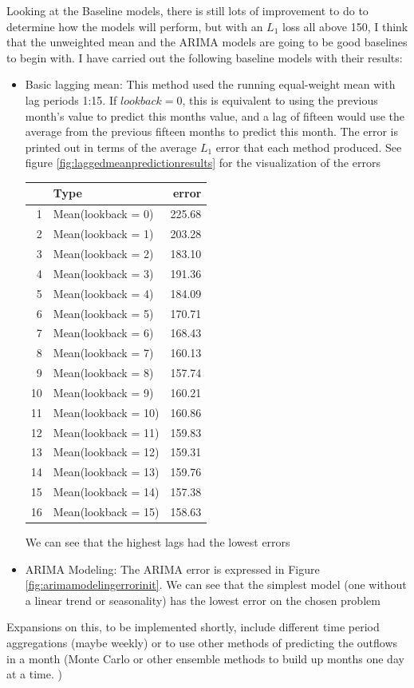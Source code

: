 \documentclass[11pt,a4paper]{article}
\newenvironment{updatematerial}{
\color{blue}
}{

}
\begin{document}
\begin{updatematerial}
	Looking at the Baseline models, there is still lots of improvement to do to determine how the models will perform, but with an $L_1$ loss all above 150, I think that the unweighted mean and the ARIMA models are going to be good baselines to begin with. I have carried out the following baseline models with their results:
	\begin{itemize}
		\item Basic lagging mean: This method used the running equal-weight mean with lag periods 1:15. If $lookback = 0$, this is equivalent to using the previous month's value to predict this months value, and a lag of fifteen would use the average from the previous fifteen months to predict this month. The error is printed out in terms of the average $L_1$ error that each method produced. See figure  \ref{fig:laggedmeanpredictionresults} for the visualization of the errors
		\begin{table}[ht]
			\centering
			\begin{tabular}{rlr}
				\hline
				& Type & error \\ 
				\hline
				1 & Mean(lookback = 0) & 225.68 \\ 
				2 & Mean(lookback = 1) & 203.28 \\ 
				3 & Mean(lookback = 2) & 183.10 \\ 
				4 & Mean(lookback = 3) & 191.36 \\ 
				5 & Mean(lookback = 4) & 184.09 \\ 
				6 & Mean(lookback = 5) & 170.71 \\ 
				7 & Mean(lookback = 6) & 168.43 \\ 
				8 & Mean(lookback = 7) & 160.13 \\ 
				9 & Mean(lookback = 8) & 157.74 \\ 
				10 & Mean(lookback = 9) & 160.21 \\ 
				11 & Mean(lookback = 10) & 160.86 \\ 
				12 & Mean(lookback = 11) & 159.83 \\ 
				13 & Mean(lookback = 12) & 159.31 \\ 
				14 & Mean(lookback = 13) & 159.76 \\ 
				15 & Mean(lookback = 14) & 157.38 \\ 
				16 & Mean(lookback = 15) & 158.63 \\ 
				\hline
			\end{tabular}
		\end{table}
		We can see that the highest lags had the lowest errors
		\item ARIMA Modeling: The ARIMA error is expressed in Figure \ref{fig:arimamodelingerrorinit}. We can see that the simplest model (one without a linear trend or seasonality)  has the lowest error on the chosen problem
	\end{itemize}
	Expansions on this, to be implemented shortly, include different time period aggregations (maybe weekly) or to use other methods of predicting the outflows in a month (Monte Carlo or other ensemble methods to build up months one day at a time. )
\end{updatematerial}
\end{document}
